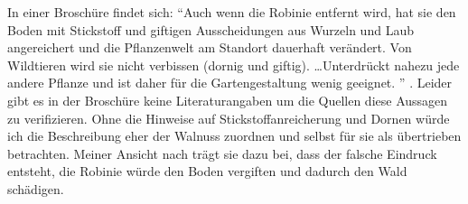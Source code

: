 \documentclass[twocolumn]{scrartcl}
\begin{document}
In einer Broschüre findet sich: \enquote{Auch wenn die Robinie entfernt wird,
hat sie den Boden mit Stickstoff und giftigen Ausscheidungen aus Wurzeln und
Laub angereichert und die Pflanzenwelt am Standort dauerhaft verändert. Von
Wildtieren wird sie nicht verbissen (dornig und giftig). \dots Unterdrückt
nahezu jede andere Pflanze und ist daher für die Gartengestaltung wenig
geeignet.%
} \citep{oebf2019aliensAusDemGarten}. Leider gibt es in der Broschüre
keine Literaturangaben um die Quellen diese Aussagen zu verifizieren.
Ohne die Hinweise auf Stickstoffanreicherung und Dornen würde ich die
Beschreibung eher der Walnuss zuordnen und selbst für sie als
übertrieben betrachten. Meiner Ansicht nach trägt sie dazu bei, dass
der falsche Eindruck entsteht, die Robinie würde den Boden vergiften
und dadurch den Wald schädigen.
\end{document}
